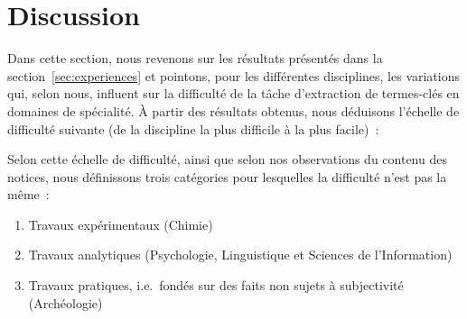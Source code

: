 \section{Discussion}
\label{sec:discussion}
  Dans cette section, nous revenons sur les résultats présentés dans la
  section~\ref{sec:experiences} et pointons, pour les différentes disciplines,
  les variations qui, selon nous, influent sur la difficulté de la tâche
  d'extraction de termes-clés en domaines de spécialité. À partir des résultats
  obtenus, nous déduisons l'échelle de difficulté suivante (de la discipline la
  plus difficile à la plus facile)~:
  \begin{figure}[h!]
    \centering
    \caption{
             \label{fig:}}
  \end{figure}
  Selon cette échelle de difficulté, ainsi que selon nos observations du contenu
  des notices, nous définissons trois catégories pour lesquelles la difficulté
  n'est pas la même~:
  \begin{enumerate}
    \item{Travaux expérimentaux (Chimie)}
    \item{Travaux analytiques (Psychologie, Linguistique et Sciences de
          l'Information)}
    \item{Travaux pratiques, i.e.~fondés sur des faits non sujets à subjectivité
          (Archéologie)}
  \end{enumerate}

